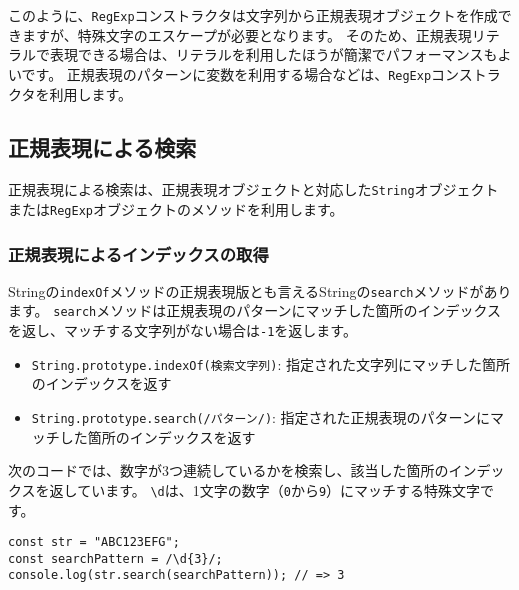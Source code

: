 このように、\texttt{RegExp}コンストラクタは文字列から正規表現オブジェクトを作成できますが、特殊文字のエスケープが必要となります。
そのため、正規表現リテラルで表現できる場合は、リテラルを利用したほうが簡潔でパフォーマンスもよいです。
正規表現のパターンに変数を利用する場合などは、\texttt{RegExp}コンストラクタを利用します。

\hypertarget{search-by-regexp}{%
\subsection{正規表現による検索}\label{search-by-regexp}}

正規表現による検索は、正規表現オブジェクトと対応した\texttt{String}オブジェクトまたは\texttt{RegExp}オブジェクトのメソッドを利用します。

\hypertarget{search-index-by-regexp}{%
\subsubsection{正規表現によるインデックスの取得}\label{search-index-by-regexp}}

\enlargethispage{\baselineskip}Stringの\texttt{indexOf}メソッドの正規表現版とも言えるStringの\texttt{search}メソッドがあります。
\texttt{search}メソッドは正規表現のパターンにマッチした箇所のインデックスを返し、マッチする文字列がない場合は\texttt{-1}を返します。

\begin{itemize}
\item
  \texttt{String.prototype.indexOf(検索文字列)}:
  指定された文字列にマッチした箇所のインデックスを返す
\item
  \texttt{String.prototype.search(/パターン/)}:
  指定された正規表現のパターンにマッチした箇所のインデックスを返す
\end{itemize}

次のコードでは、数字が3つ連続しているかを検索し、該当した箇所のインデックスを返しています。
\texttt{\textbackslash d}は、1文字の数字（\texttt{0}から\texttt{9}）にマッチする特殊文字です。

\begin{lstlisting}
const str = "ABC123EFG";
const searchPattern = /\d{3}/;
console.log(str.search(searchPattern)); // => 3
\end{lstlisting}

